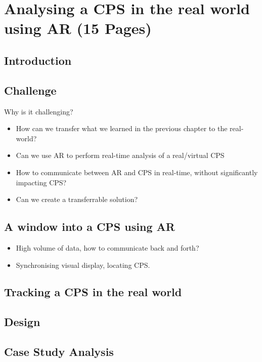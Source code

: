 \chapter{Analysing a CPS in the real world using AR (15 Pages)}
\section{Introduction}
\label{sec:Introduction}

\section{Challenge}
\label{sec:Challenge}
Why is it challenging?
\begin{itemize}
  \item How can we transfer what we learned in the previous chapter to the real-world?
  \item Can we use AR to perform real-time analysis of a real/virtual CPS
  \item How to communicate between AR and CPS in real-time, without significantly impacting CPS?
  \item Can we create a transferrable solution?
\end{itemize}

\section{A window into a CPS using AR}
\label{sec:ar}
\begin{itemize}
  \item High volume of data, how to communicate back and forth?
  \item Synchronising visual display, locating CPS.
\end{itemize}

\section{Tracking a CPS in the real world} %
\label{sec:diffing_two_cps_visually}


\section{Design}
\label{sec:Design}

\section{Case Study Analysis}
\label{sec:Case Study Analysis}

